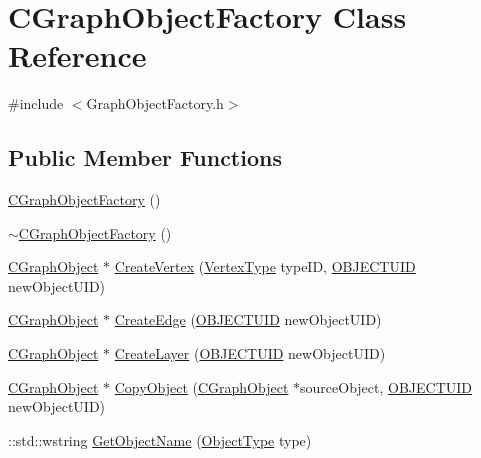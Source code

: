 \hypertarget{class_c_graph_object_factory}{}\section{C\+Graph\+Object\+Factory Class Reference}
\label{class_c_graph_object_factory}


{\ttfamily \#include $<$Graph\+Object\+Factory.\+h$>$}

\subsection*{Public Member Functions}
\begin{DoxyCompactItemize}
\item 
\hyperlink{class_c_graph_object_factory_a7f8cb51860408af41232c1ca910a7009}{C\+Graph\+Object\+Factory} ()
\item 
\hyperlink{class_c_graph_object_factory_a6d828c249e51609ae28e87c09605529f}{$\sim$\+C\+Graph\+Object\+Factory} ()
\item 
\hyperlink{class_c_graph_object}{C\+Graph\+Object} $\ast$ \hyperlink{class_c_graph_object_factory_af762c948aaf718c4ad5e75b64a9b4562}{Create\+Vertex} (\hyperlink{_object_database_defines_8h_afa099a55c5746eff5a0e1ffc04f53cc0}{Vertex\+Type} type\+I\+D, \hyperlink{_object_database_defines_8h_a164ec120b01429b93c9cd0bef2a67e64}{O\+B\+J\+E\+C\+T\+U\+I\+D} new\+Object\+U\+I\+D)
\item 
\hyperlink{class_c_graph_object}{C\+Graph\+Object} $\ast$ \hyperlink{class_c_graph_object_factory_a62cf27f3a94a83f147297e548982164d}{Create\+Edge} (\hyperlink{_object_database_defines_8h_a164ec120b01429b93c9cd0bef2a67e64}{O\+B\+J\+E\+C\+T\+U\+I\+D} new\+Object\+U\+I\+D)
\item 
\hyperlink{class_c_graph_object}{C\+Graph\+Object} $\ast$ \hyperlink{class_c_graph_object_factory_a30a21324b8266da88e4fc2e0b64e60d6}{Create\+Layer} (\hyperlink{_object_database_defines_8h_a164ec120b01429b93c9cd0bef2a67e64}{O\+B\+J\+E\+C\+T\+U\+I\+D} new\+Object\+U\+I\+D)
\item 
\hyperlink{class_c_graph_object}{C\+Graph\+Object} $\ast$ \hyperlink{class_c_graph_object_factory_ac7fbd302cbcdacc6eb173953aaf85317}{Copy\+Object} (\hyperlink{class_c_graph_object}{C\+Graph\+Object} $\ast$source\+Object, \hyperlink{_object_database_defines_8h_a164ec120b01429b93c9cd0bef2a67e64}{O\+B\+J\+E\+C\+T\+U\+I\+D} new\+Object\+U\+I\+D)
\item 
\+::std\+::wstring \hyperlink{class_c_graph_object_factory_a6932ee43c1c80f0123aed6e0e4141090}{Get\+Object\+Name} (\hyperlink{_object_database_defines_8h_a842c5e2e69277690b064bf363c017980}{Object\+Type} type)

\end{DoxyCompactItemize}
